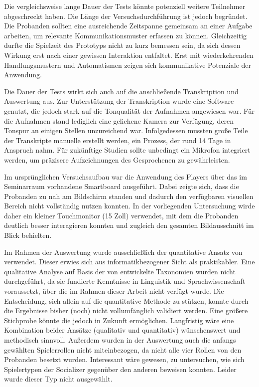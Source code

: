 Die vergleichsweise lange Dauer der Tests könnte potenziell weitere Teilnehmer abgeschreckt haben. Die Länge der Versuchsdurchführung ist jedoch begründet. Die Probanden sollten eine ausreichende Zeitspanne gemeinsam an einer Aufgabe arbeiten, um relevante Kommunikationsmuster erfassen zu können. Gleichzeitig durfte die Spielzeit des Prototyps nicht zu kurz bemessen sein, da sich dessen Wirkung erst nach einer gewissen Interaktion entfaltet. Erst mit wiederkehrenden Handlungsmustern und Automatismen zeigen sich kommunikative Potenziale der Anwendung.

Die Dauer der Tests wirkt sich auch auf die anschließende Transkription und Auswertung aus. Zur Unterstützung der Transkription wurde eine Software genutzt, die jedoch stark auf die Tonqualität der Aufnahmen angewiesen war. Für die Aufnahmen stand lediglich eine geliehene Kamera zur Verfügung, deren Tonspur an einigen Stellen unzureichend war. Infolgedessen mussten große Teile der Transkripte manuelle erstellt werden, ein Prozess, der rund 14 Tage in Anspruch nahm. Für zukünftige Studien sollte unbedingt ein Mikrofon integriert werden, um präzisere Aufzeichnungen des Gesprochenen zu gewährleisten. 

Im ursprünglichen Versuchsaufbau war die Anwendung des Players über das im Seminarraum vorhandene Smartboard ausgeführt. Dabei zeigte sich, dass die Probanden zu nah am Bildschirm standen und dadurch den verfügbaren visuellen Bereich nicht vollständig nutzen konnten. In der vorliegenden Untersuchung wirde daher ein kleiner Touchmonitor (15 Zoll) verwendet, mit dem die Probanden deutlich besser interagieren konnten und zugleich den gesamten Bildausschnitt im Blick behielten.

Im Rahmen der Auswertung wurde ausschließlich der quantitative Ansatz von \cite{nasir_effect_2015} verwendet. Dieser erwies sich aus informatikbezogener Sicht als praktikabler. Eine qualitative Analyse auf Basis der von \cite{baykal_collaboration_2023} entwickelte Taxonomien wurden nicht durchgeführt, da sie fundierte Kenntnisse in Linguistik und Sprachwissenschaft voraussetzt, über die im Rahmen dieser Arbeit nicht verfügt wurde. Die Entscheidung, sich allein auf die quantitative Methode zu stützen, konnte durch die Ergebnisse bisher (noch) nicht vollumfänglich validiert werden. Eine größere Stichprobe könnte die jedoch in Zukunft ermöglichen. Langfristig wäre eine Kombination beider Ansätze (qualitativ und quantitativ) wünschenswert und methodisch sinnvoll. Außerdem wurden in der Auswertung auch die anfangs gewählten Spielerrollen nicht miteinbezogen, da nicht alle vier Rollen von den Probanden besetzt wurden. Interessant wäre gewesen, zu untersuchen, wie sich Spielertypen der Socializer gegenüber den anderen beweisen konnten. Leider wurde dieser Typ nicht ausgewählt.